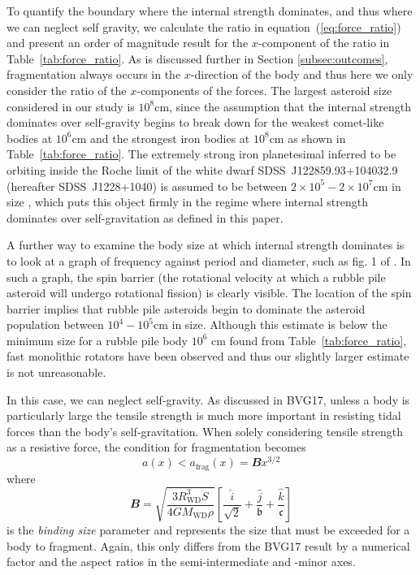 \documentclass[fleqn,usenatbib]{mnras}
\begin{document}
To quantify the boundary where the internal strength dominates, and thus where we can neglect self gravity, we calculate the ratio in equation~(\ref{eq:force_ratio}) and present an order of magnitude result for the $x$-component of the ratio in Table~\ref{tab:force_ratio}.
As is discussed further in Section \ref{subsec:outcomes}, fragmentation always occurs in the $x$-direction of the body and thus here we only consider the ratio of the $x$-components of the forces. 
The largest asteroid size considered in our study is $10^8$cm, since the assumption that the internal strength dominates over self-gravity begins to break down for the weakest comet-like bodies at $10^6$cm and the strongest iron bodies at $10^8$cm as shown in Table~\ref{tab:force_ratio}.
The extremely strong iron planetesimal inferred to be orbiting inside the Roche limit of the white dwarf SDSS~J122859.93+104032.9 (hereafter SDSS~J1228+1040) is assumed to be between $2\times 10^5 - 2 \times 10^7$cm in size \citep{Manser2019}, which puts this object firmly in the regime where internal strength dominates over self-gravitation as defined in this paper. 

A further way to examine the body size at which internal strength dominates is to look at a graph of frequency against period and diameter, such as fig. 1 of \cite{Hestroffer2019}.
In such a graph, the spin barrier (the rotational velocity at which a rubble pile asteroid will undergo rotational fission) is clearly visible.
The location of the spin barrier implies that rubble pile asteroids begin to dominate the asteroid population between $10^4-10^5$cm in size. 
Although this estimate is below the minimum size for a rubble pile body $10^6$ cm found from Table~\ref{tab:force_ratio}, fast monolithic rotators have been observed and thus our slightly larger estimate is not unreasonable. 

In this case, we can neglect self-gravity. As discussed in BVG17, unless a body is particularly large the tensile strength is much more important in resisting tidal forces than the body's self-gravitation. 
When solely considering tensile strength as a resistive force, the condition for fragmentation becomes 
\begin{equation}
    \label{eq:a_frag}
    a(x) < a_{\text{frag}}(x) = \mathbfit{B} x^{3/2}
\end{equation}
where 
\begin{equation}
    \label{eq:binding_param}
    \mathbfit{B} = \sqrt{\frac{3R_\text{WD}^3S}{4GM_\text{WD}\rho}}\left[ \frac{\hat{i}}{\sqrt{2}} + \frac{\hat{j}}{\mathfrak{b}} + \frac{\hat{k}}{\mathfrak{c}} \right]
\end{equation}
is the \textit{binding size} parameter and represents the size that must be exceeded for a body to fragment.   
Again, this only differs from the BVG17 result by a numerical factor and the aspect ratios in the semi-intermediate and -minor axes.
\end{document}
